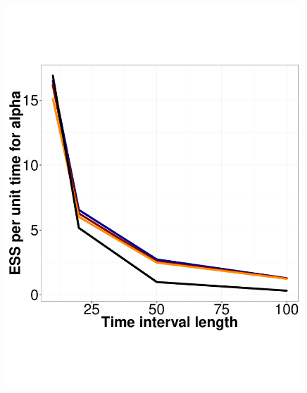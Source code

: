   \begin{figure}%
  \centering
  \begin{minipage}[hp]{0.24\linewidth}
  \centering
    \includegraphics [width=0.99\textwidth, angle=0]{figs/ESS_vs_t_alpha_fixobservation.pdf}
    \end{minipage}
  \begin{minipage}[hp]{0.24\linewidth}
  \centering

\end{minipage}
\end{figure}
